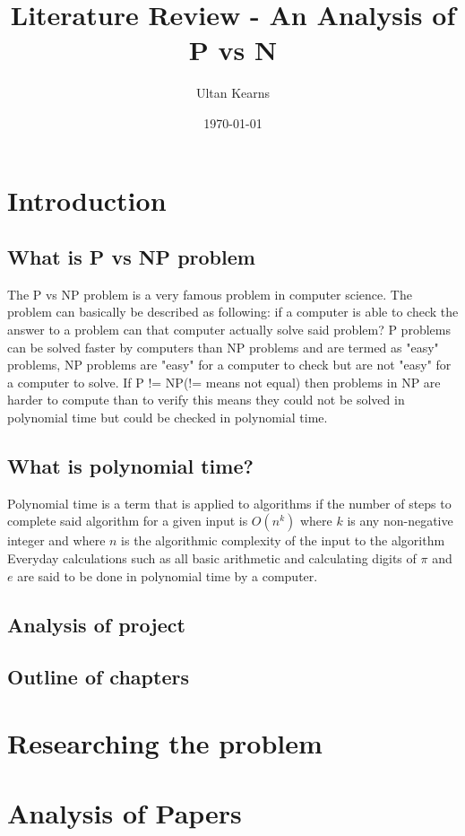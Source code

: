 \documentclass{report}
\title{Literature Review - An Analysis of P vs N}
\author{Ultan Kearns}
\date{\today}
\begin{document}
\maketitle
\tableofcontents
\chapter{Introduction}
\section{What is P vs NP problem}
The P vs NP problem is a very famous problem in computer science.  The problem
can basically be described as following: if a computer is able to check the answer
to a problem can that computer actually solve said problem?\cite{wiki}  P problems can be
solved faster by computers than NP problems and are termed as "easy" problems, NP problems
are "easy" for a computer to check but are not "easy" for a computer to solve.\cite{wiki}
If P != NP(!= means not equal) then problems in NP are harder to compute than to verify
this means they could not be solved in polynomial time but could be checked in polynomial time.
\section{What is polynomial time?}
Polynomial time is a term that is applied to algorithms if the number of steps
to complete said algorithm for a given input is $O(n^k)$ where $k$ is any non-negative
integer and where $n$ is the algorithmic complexity of the input to the algorithm \cite{polynomial}
Everyday calculations such as all basic arithmetic and calculating digits of $\pi$ and $e$ are said
to be done in polynomial time by a computer\cite{polynomial}.
\section{Analysis of project}
\section{Outline of chapters}
\chapter{Researching the problem}
\chapter{Analysis of Papers}


\end{document}
